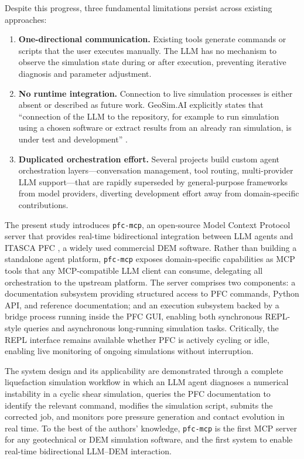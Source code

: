Despite this progress, three fundamental limitations persist across existing approaches:
\begin{enumerate}
  \item \textbf{One-directional communication.} Existing tools generate commands or scripts that the user executes manually. The LLM has no mechanism to observe the simulation state during or after execution, preventing iterative diagnosis and parameter adjustment.
  \item \textbf{No runtime integration.} Connection to live simulation processes is either absent or described as future work. GeoSim.AI explicitly states that ``connection of the LLM to the repository, for example to run simulation using a chosen software or extract results from an already ran simulation, is under test and development'' \citep{GeoSimAI2025}.
  \item \textbf{Duplicated orchestration effort.} Several projects build custom agent orchestration layers---conversation management, tool routing, multi-provider LLM support---that are rapidly superseded by general-purpose frameworks from model providers, diverting development effort away from domain-specific contributions.
\end{enumerate}

The present study introduces \texttt{pfc-mcp}, an open-source Model Context Protocol \citep[MCP;][]{MCP2024} server that provides real-time bidirectional integration between LLM agents and ITASCA PFC \citep{PFC2023}, a widely used commercial DEM software. Rather than building a standalone agent platform, \texttt{pfc-mcp} exposes domain-specific capabilities as MCP tools that any MCP-compatible LLM client can consume, delegating all orchestration to the upstream platform. The server comprises two components: a documentation subsystem providing structured access to PFC commands, Python API, and reference documentation; and an execution subsystem backed by a bridge process running inside the PFC GUI, enabling both synchronous REPL-style queries and asynchronous long-running simulation tasks. Critically, the REPL interface remains available whether PFC is actively cycling or idle, enabling live monitoring of ongoing simulations without interruption.

The system design and its applicability are demonstrated through a complete liquefaction simulation workflow in which an LLM agent diagnoses a numerical instability in a cyclic shear simulation, queries the PFC documentation to identify the relevant command, modifies the simulation script, submits the corrected job, and monitors pore pressure generation and contact evolution in real time. To the best of the authors' knowledge, \texttt{pfc-mcp} is the first MCP server for any geotechnical or DEM simulation software, and the first system to enable real-time bidirectional LLM--DEM interaction.

